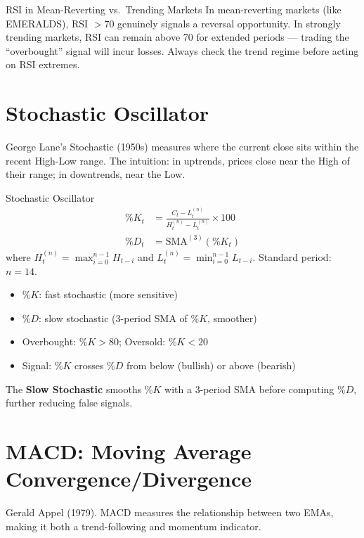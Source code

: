 \documentclass[12pt,a4paper,openany]{report}
\theoremstyle{definition}
\begin{document}
\begin{warningbox}{RSI in Mean-Reverting vs.\ Trending Markets}
In mean-reverting markets (like EMERALDS), RSI $> 70$ genuinely signals a reversal opportunity. In strongly trending markets, RSI can remain above 70 for extended periods — trading the ``overbought'' signal will incur losses. Always check the trend regime before acting on RSI extremes.
\end{warningbox}

\section{Stochastic Oscillator}

George Lane's Stochastic (1950s) measures where the current close sits within the recent High-Low range. The intuition: in uptrends, prices close near the High of their range; in downtrends, near the Low.

\begin{definitionbox}{Stochastic Oscillator}
\begin{align}
  \%K_t &= \frac{C_t - L_t^{(n)}}{H_t^{(n)} - L_t^{(n)}} \times 100 \\
  \%D_t &= \text{SMA}^{(3)}(\%K_t)
\end{align}
where $H_t^{(n)} = \max_{i=0}^{n-1} H_{t-i}$ and $L_t^{(n)} = \min_{i=0}^{n-1} L_{t-i}$. Standard period: $n = 14$.
\end{definitionbox}

\begin{itemize}
  \item $\%K$: fast stochastic (more sensitive)
  \item $\%D$: slow stochastic (3-period SMA of $\%K$, smoother)
  \item Overbought: $\%K > 80$; Oversold: $\%K < 20$
  \item Signal: $\%K$ crosses $\%D$ from below (bullish) or above (bearish)
\end{itemize}

The \textbf{Slow Stochastic} smooths $\%K$ with a 3-period SMA before computing $\%D$, further reducing false signals.

\section{MACD: Moving Average Convergence/Divergence}

Gerald Appel (1979). MACD measures the relationship between two EMAs, making it both a trend-following and momentum indicator.
\end{document}
